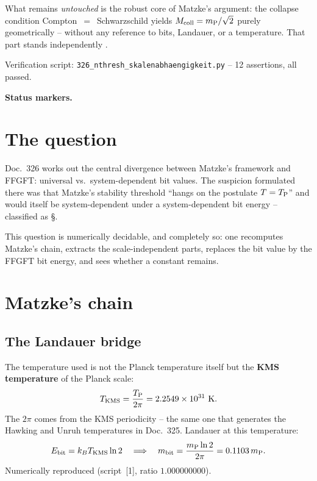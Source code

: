 What remains \emph{untouched} is the robust core of Matzke's argument:
the collapse condition Compton~$=$~Schwarzschild yields
$M_{\mathrm{coll}} = m_{\mathrm{P}}/\sqrt{2}$ purely geometrically -- without any reference to
bits, Landauer, or a temperature. That part stands independently \B.

Verification script: \texttt{326\_nthresh\_skalenabhaengigkeit.py} --
12 assertions, all passed.

\medskip\noindent\textbf{Status markers.}


\section{The question}

Doc.~326 works out the central divergence between Matzke's framework and
FFGFT: universal vs.\ system-dependent bit values.
The suspicion formulated there was that Matzke's stability threshold
\enquote{hangs on the postulate $T = T_{\mathrm{P}}$} and would itself be
system-dependent under a system-dependent bit energy -- classified as \S.

This question is numerically decidable, and completely so:
one recomputes Matzke's chain, extracts the scale-independent parts,
replaces the bit value by the FFGFT bit energy, and sees whether a
constant remains.

\section{Matzke's chain}

\subsection{The Landauer bridge}

The temperature used is not the Planck temperature itself but the
\textbf{KMS temperature} of the Planck scale:
\begin{equation}
  T_{\mathrm{KMS}} = \frac{T_{\mathrm{P}}}{2\pi} = 2.2549\times10^{31}~\mathrm{K}.
\end{equation}
The $2\pi$ comes from the KMS periodicity -- the same one that generates
the Hawking and Unruh temperatures in Doc.~325.
Landauer at this temperature:
\begin{equation}
  E_{\mathrm{bit}} = k_B T_{\mathrm{KMS}} \ln 2
  \quad\Longrightarrow\quad
  m_{\mathrm{bit}} = \frac{m_{\mathrm{P}} \ln 2}{2\pi} = 0.1103\,m_{\mathrm{P}} .
\end{equation}
Numerically reproduced (script~[1], ratio $1.000000000$). \B

